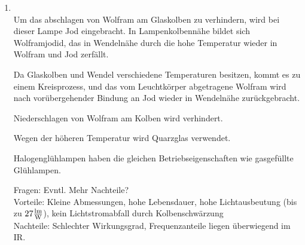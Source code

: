 \begin{enumerate}
    \item   {}\\
    
    Um das abschlagen von Wolfram am Glaskolben zu verhindern, wird bei dieser Lampe Jod eingebracht. In Lampenkolbennähe bildet
    sich Wolframjodid, das in Wendelnähe durch die hohe Temperatur wieder in Wolfram und
    Jod zerfällt.
    
    Da Glaskolben und Wendel verschiedene Temperaturen besitzen, kommt es zu einem
    Kreisprozess, und das vom Leuchtkörper abgetragene Wolfram wird nach vorübergehender
    Bindung an Jod wieder in Wendelnähe zurückgebracht.
    
    Niederschlagen von Wolfram am Kolben wird verhindert.
    
    Wegen der höheren Temperatur wird Quarzglas verwendet.
    
    Halogenglühlampen haben die gleichen Betriebseigenschaften wie gasgefüllte Glühlampen.

            Fragen: Evntl. Mehr Nachteile?\\
            Vorteile: Kleine Abmessungen, hohe Lebensdauer, hohe Lichtausbeutung (bis zu $27\frac{\textnormal{lm}}{\textnormal{W}}$), kein Lichtstromabfall durch Kolbenschwärzung\\
            Nachteile: Schlechter Wirkungsgrad, Frequenzanteile liegen überwiegend im IR.
\end{enumerate}